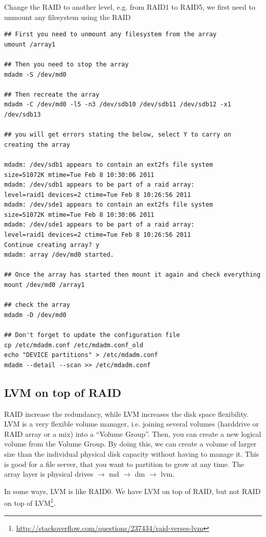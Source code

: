 Change the RAID to another level, e.g. from RAID1 to RAID5, we first need to
unmount any filesystem using the RAID
\begin{verbatim}
## First you need to unmount any filesystem from the array
umount /array1

## Then you need to stop the array
mdadm -S /dev/md0

## Then recreate the array
mdadm -C /dev/md0 -l5 -n3 /dev/sdb10 /dev/sdb11 /dev/sdb12 -x1 /dev/sdb13

## you will get errors stating the below, select Y to carry on creating the array

mdadm: /dev/sdb1 appears to contain an ext2fs file system
size=51072K mtime=Tue Feb 8 10:30:06 2011
mdadm: /dev/sdb1 appears to be part of a raid array:
level=raid1 devices=2 ctime=Tue Feb 8 10:26:56 2011
mdadm: /dev/sde1 appears to contain an ext2fs file system
size=51072K mtime=Tue Feb 8 10:30:06 2011
mdadm: /dev/sde1 appears to be part of a raid array:
level=raid1 devices=2 ctime=Tue Feb 8 10:26:56 2011
Continue creating array? y
mdadm: array /dev/md0 started.

## Once the array has started then mount it again and check everything 
mount /dev/md0 /array1

## check the array
mdadm -D /dev/md0

## Don't forget to update the configuration file
cp /etc/mdadm.conf /etc/mdadm.conf_old 
echo "DEVICE partitions" > /etc/mdadm.conf
mdadm --detail --scan >> /etc/mdadm.conf 
\end{verbatim}

\subsection{LVM on top of RAID}
\label{sec:LVM_RAID}

RAID increase the redundancy, while LVM increases the disk space flexibility.
LVM is a very flexible volume manager, i.e. joining several volumes (harddrive
or RAID array or a mix) into a ``Volume Group''. Then, you can create a new
logical volume from the Volume Group. By doing this, we can create a volume of
larger size than the individual physical disk capacity without having to manage
it.
This is good for a file server, that you want to partition to grow at any time.
The array layer is physical drives $\rightarrow$ md $\rightarrow$ dm
$\rightarrow$ lvm.

In some ways, LVM is like RAID0. We have LVM on top of RAID, but not RAID on top of
LVM\footnote{\url{http://stackoverflow.com/questions/237434/raid-verses-lvm}}.

